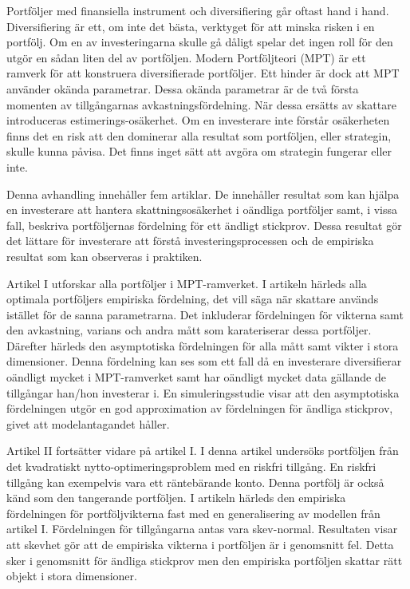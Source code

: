 Portföljer med finansiella instrument och diversifiering går oftast hand i hand.
Diversifiering är ett, om inte det bästa, verktyget för att minska risken i en portfölj.
Om en av investeringarna skulle gå dåligt spelar det ingen roll för den utgör en sådan liten del av portföljen.
Modern Portföljteori (MPT) är ett ramverk för att konstruera diversifierade portföljer.
Ett hinder är dock att MPT använder okända parametrar.
Dessa okända parametrar är de två första momenten av tillgångarnas avkastningsfördelning.
När dessa ersätts av skattare introduceras estimerings-osäkerhet.
Om en investerare inte förstår osäkerheten finns det en risk att den dominerar alla resultat som portföljen, eller strategin, skulle kunna påvisa.
Det finns inget sätt att avgöra om strategin fungerar eller inte.

Denna avhandling innehåller fem artiklar.
De innehåller resultat som kan hjälpa en investerare att hantera skattningsosäkerhet i oändliga portföljer samt, i vissa fall, beskriva portföljernas fördelning för ett ändligt stickprov.
Dessa resultat gör det lättare för investerare att förstå investeringsprocessen och de empiriska resultat som kan observeras i praktiken.

Artikel I utforskar alla portföljer i MPT-ramverket.
I artikeln härleds alla optimala portföljers empiriska fördelning, det vill säga när skattare används istället för de sanna parametrarna.
Det inkluderar fördelningen för vikterna samt den avkastning, varians och andra mått som karateriserar dessa portföljer.
Därefter härleds den asymptotiska fördelningen för alla mått samt vikter i stora dimensioner.
Denna fördelning kan ses som ett fall då en investerare diversifierar oändligt mycket i MPT-ramverket samt har oändligt mycket data gällande de tillgångar han/hon investerar i.
En simuleringsstudie visar att den asymptotiska fördelningen utgör en god approximation av fördelningen för ändliga stickprov, givet att modelantagandet håller.

Artikel II fortsätter vidare på artikel I.
I denna artikel undersöks portföljen från det kvadratiskt nytto-optimeringsproblem med en riskfri tillgång. 
En riskfri tillgång kan exempelvis vara ett räntebärande konto.
Denna portfölj är också känd som den tangerande portföljen.
I artikeln härleds den empiriska fördelningen för portföljvikterna fast med en generalisering av modellen från artikel I.
Fördelningen för tillgångarna antas vara skev-normal.
Resultaten visar att skevhet gör att de empiriska vikterna i portföljen är i genomsnitt fel.
Detta sker i genomsnitt för ändliga stickprov men den empiriska portföljen skattar rätt objekt i stora dimensioner. 

